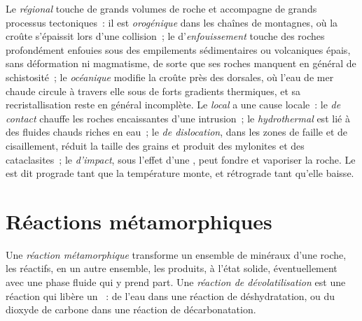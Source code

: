 Le  \emph{régional} touche de grands volumes de roche et accompagne de grands
processus tectoniques~: il est \emph{orogénique} dans les chaînes de montagnes, où la croûte s'épaissit lors d'une
collision~; le  d'\emph{enfouissement} touche des roches profondément enfouies sous
des empilements sédimentaires ou volcaniques épais, sans déformation ni magmatisme, de sorte que ses roches
manquent en général de schistosité~; le  \emph{océanique} modifie la croûte près des
dorsales, où l'eau de mer chaude circule à travers elle sous de forts gradients thermiques,
et sa recristallisation reste en général incomplète. Le  \emph{local}
a une cause locale~: le  \emph{de contact} chauffe les roches encaissantes d'une intrusion~;
le  \emph{hydrothermal} est lié à des fluides chauds riches en eau~;
le  \emph{de dislocation}, dans les zones de faille et de cisaillement, réduit la taille des grains et
produit des mylonites et des cataclasites~; le  \emph{d'impact}, sous l'effet d'une
, peut fondre et vaporiser la roche. Le  est dit prograde tant que la
température monte, et rétrograde tant qu'elle baisse.

\section{Réactions métamorphiques}\label{sec:b2:metamorphic-facies:reactions}

\begin{definition}\label{def:b2:metamorphic-facies:reaction}
Une \emph{réaction métamorphique} transforme un ensemble de minéraux
d'une roche, les réactifs, en un autre ensemble, les produits, à l'état solide,
éventuellement avec une phase fluide qui y prend part. Une \emph{réaction de dévolatilisation}
est une réaction qui libère un ~: de l'eau dans une réaction de
déshydratation, ou du dioxyde de carbone dans une réaction de décarbonatation.
\end{definition}

